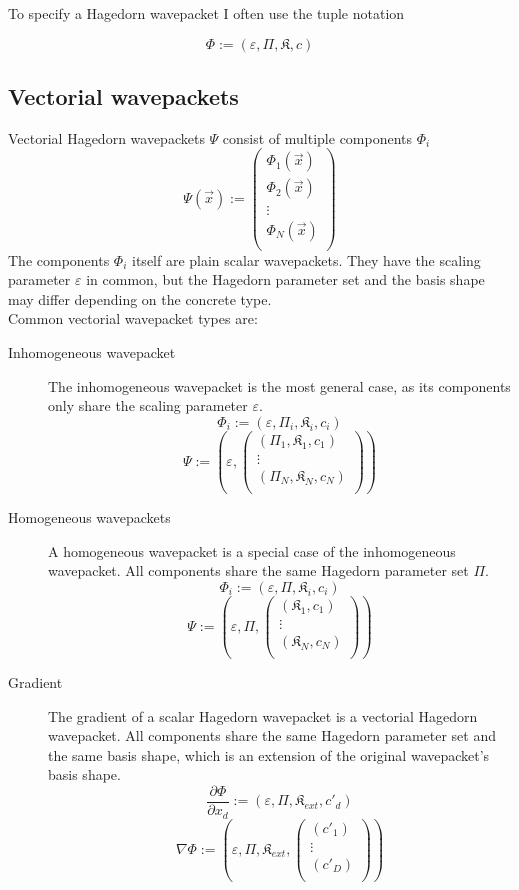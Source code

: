 \documentclass{article}
\begin{document}
To specify a Hagedorn wavepacket I often use the tuple notation

\[
  \Phi := \left(\varepsilon,\Pi,\mathfrak{K},c\right)
\]

\subsection{Vectorial wavepackets}
Vectorial Hagedorn wavepackets \(\Psi\) consist of multiple components \(\Phi_i\)
\[
  \Psi(\vec{x}) :=
  \begin{pmatrix}
    \Phi_1(\vec{x}) \\
    \Phi_2(\vec{x}) \\
    \vdots \\
    \Phi_N(\vec{x}) \\
  \end{pmatrix}
\]
The components \(\Phi_i\) itself are plain scalar wavepackets.
They have the scaling parameter \(\varepsilon\) in common, but
the Hagedorn parameter set and the basis shape may differ depending on
the concrete type. \\
Common vectorial wavepacket types are:
\begin{description}
\item[Inhomogeneous wavepacket]
  The inhomogeneous wavepacket is the most general case, as its components only share
  the scaling parameter \(\varepsilon\).
  \[
    \Phi_i := (\varepsilon, \Pi_i, \mathfrak{K}_i, c_i) \] \[
    \Psi := \left(\varepsilon,
    \begin{pmatrix}
      (\Pi_1, \mathfrak{K}_1, c_1) \\
      \vdots \\
      (\Pi_N, \mathfrak{K}_N, c_N) \\
    \end{pmatrix}\right)
  \]
\item[Homogeneous wavepackets]
  A homogeneous wavepacket is a special case of the inhomogeneous wavepacket.
  All components share the same Hagedorn parameter set \(\Pi\).
  \[
    \Phi_i := (\varepsilon, \Pi, \mathfrak{K}_i, c_i) \] \[
    \Psi := \left(\varepsilon, \Pi,
    \begin{pmatrix}
      (\mathfrak{K}_1, c_1) \\
      \vdots \\
      (\mathfrak{K}_N, c_N) \\
    \end{pmatrix}\right)
  \]
\item[Gradient]
  The gradient of a scalar Hagedorn wavepacket is a vectorial Hagedorn
  wavepacket. All components share the same Hagedorn parameter set and the
  same basis shape, which is an extension of the original wavepacket's basis shape.
  \[
    \frac{\partial \Phi}{\partial x_d} := (\varepsilon, \Pi, \mathfrak{K}_{ext}, c'_d) \] \[
    \nabla \Phi := \left(\varepsilon, \Pi, \mathfrak{K}_{ext},
    \begin{pmatrix}
      (c'_1) \\
      \vdots \\
      (c'_D) \\
    \end{pmatrix}\right)
  \]
\end{description}
\end{document}
